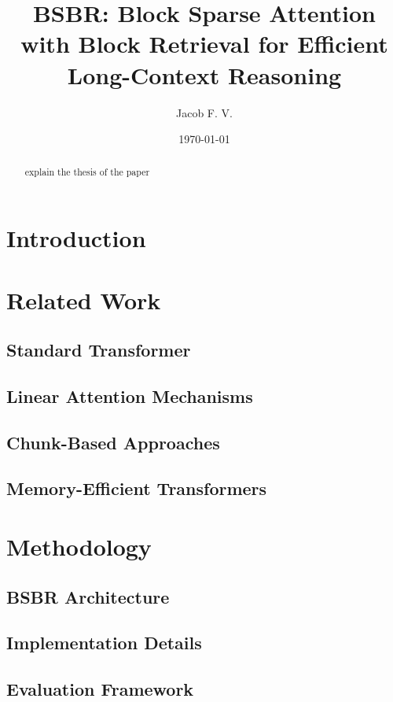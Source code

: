 \documentclass[12pt]{article}
\title{BSBR: Block Sparse Attention with Block Retrieval for Efficient Long-Context Reasoning}
\author{Jacob F. V.}
\date{\today}
\begin{document}
\maketitle

\begin{abstract}
explain the thesis of the paper
\end{abstract}

\section{Introduction}
\label{sec:introduction}



\section{Related Work}
\label{sec:related_work}

\subsection{Standard Transformer}
\subsection{Linear Attention Mechanisms}
\subsection{Chunk-Based Approaches}
\subsection{Memory-Efficient Transformers}

\section{Methodology}
\label{sec:methodology}

\subsection{BSBR Architecture}
\subsection{Implementation Details}
\subsection{Evaluation Framework}
\end{document}
